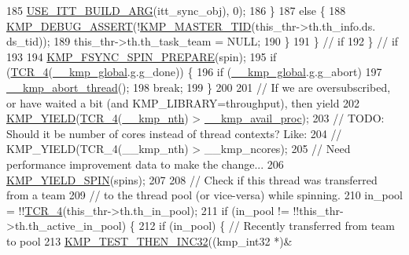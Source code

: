 \begin{DoxyCode}
{{185                                             \hyperlink{kmp__itt_8h_ac31864b9b5b30f5dcac5ab285ee97ae0}{USE\_ITT\_BUILD\_ARG}(itt\_sync\_obj), 0);
186                 \}
187                 \textcolor{keywordflow}{else} \{
188                     \hyperlink{kmp__debug_8h_ad766efc30e33e28634691088e80cdf08}{KMP\_DEBUG\_ASSERT}(!\hyperlink{kmp_8h_a7a4e2494d803bbee99f23af2117f6dd8}{KMP\_MASTER\_TID}(this\_thr->th.th\_info.ds.
      ds\_tid));
189                     this\_thr->th.th\_task\_team = NULL;
190                 \}
191             \} \textcolor{comment}{// if}
192         \} \textcolor{comment}{// if}
193 
194         \hyperlink{kmp__itt_8h_aadbbcf10e55850897e6d495729925851}{KMP\_FSYNC\_SPIN\_PREPARE}(spin);
195         \textcolor{keywordflow}{if} (\hyperlink{kmp__os_8h_acd6256e4afba32d90997235fc0a38a74}{TCR\_4}(\hyperlink{kmp_8h_a11b71922a4df46ff9e8dbc68693e8d67}{\_\_kmp\_global}.g.g\_done)) \{
196             \textcolor{keywordflow}{if} (\hyperlink{kmp_8h_a11b71922a4df46ff9e8dbc68693e8d67}{\_\_kmp\_global}.g.g\_abort)
197                 \hyperlink{kmp_8h_a3af0772074c6291cf8d346cef0e22c75}{\_\_kmp\_abort\_thread}();
198             \textcolor{keywordflow}{break};
199         \}
200 
201         \textcolor{comment}{// If we are oversubscribed, or have waited a bit (and KMP\_LIBRARY=throughput), then yield}
202         \hyperlink{kmp_8h_a9f0d88d1970adda4ad38d272e65d7844}{KMP\_YIELD}(\hyperlink{kmp__os_8h_acd6256e4afba32d90997235fc0a38a74}{TCR\_4}(\hyperlink{kmp_8h_a774ce85ac109df119feaca45ed4e69b1}{\_\_kmp\_nth}) > \hyperlink{kmp_8h_adc73a89e0c77c9b0a3233f9fde48a5b2}{\_\_kmp\_avail\_proc});
203         \textcolor{comment}{// TODO: Should it be number of cores instead of thread contexts? Like:}
204         \textcolor{comment}{// KMP\_YIELD(TCR\_4(\_\_kmp\_nth) > \_\_kmp\_ncores);}
205         \textcolor{comment}{// Need performance improvement data to make the change...}
206         \hyperlink{kmp_8h_a0b31ac108fea7d8034ea5145d74a7a77}{KMP\_YIELD\_SPIN}(spins);
207 
208         \textcolor{comment}{// Check if this thread was transferred from a team}
209         \textcolor{comment}{// to the thread pool (or vice-versa) while spinning.}
210         in\_pool = !!\hyperlink{kmp__os_8h_acd6256e4afba32d90997235fc0a38a74}{TCR\_4}(this\_thr->th.th\_in\_pool);
211         \textcolor{keywordflow}{if} (in\_pool != !!this\_thr->th.th\_active\_in\_pool) \{
212             \textcolor{keywordflow}{if} (in\_pool) \{ \textcolor{comment}{// Recently transferred from team to pool}
213                 \hyperlink{kmp__os_8h_a201982f51ff23ad84ae6781ad4265e3a}{KMP\_TEST\_THEN\_INC32}((kmp\_int32 *)&
}}
\end{DoxyCode}
